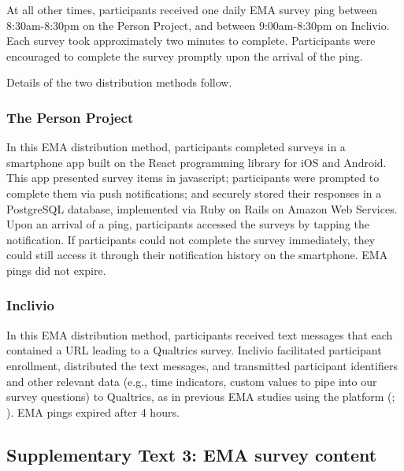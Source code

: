 \documentclass[
]{article}
\begin{document}
At all other times, participants received one daily EMA survey ping
between 8:30am-8:30pm on the Person Project, and between 9:00am-8:30pm
on Inclivio. Each survey took approximately two minutes to complete.
Participants were encouraged to complete the survey promptly upon the
arrival of the ping.

Details of the two distribution methods follow.

\subsubsection*{The Person Project}\label{the-person-project}

In this EMA distribution method, participants completed surveys in a
smartphone app built on the React programming library for iOS and
Android. This app presented survey items in javascript; participants
were prompted to complete them via push notifications; and securely
stored their responses in a PostgreSQL database, implemented via Ruby on
Rails on Amazon Web Services. Upon an arrival of a ping, participants
accessed the surveys by tapping the notification. If participants could
not complete the survey immediately, they could still access it through
their notification history on the smartphone. EMA pings did not expire.

\subsubsection*{Inclivio}\label{inclivio}

In this EMA distribution method, participants received text messages
that each contained a URL leading to a Qualtrics survey. Inclivio
facilitated participant enrollment, distributed the text messages, and
transmitted participant identifiers and other relevant data (e.g., time
indicators, custom values to pipe into our survey questions) to
Qualtrics, as in previous EMA studies using the platform
(;
). EMA pings expired after 4
hours.

\subsection*{Supplementary Text 3: EMA survey
content}\label{supplementary-text-3-ema-survey-content}
\end{document}
